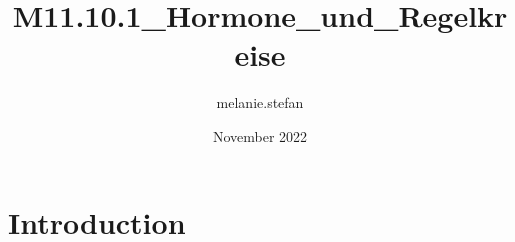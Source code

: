 \documentclass{article}
\title{M11.10.1_Hormone_und_Regelkreise}
\author{melanie.stefan }
\date{November 2022}
\begin{document}
\maketitle

\section{Introduction}
\end{document}
